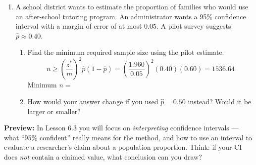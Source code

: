 \documentclass[10pt]{article}
\begin{document}
\begin{enumerate}
  \item A school district wants to estimate the proportion of families who would use
        an after-school tutoring program. An administrator wants a 95\% confidence interval
        with a margin of error of at most 0.05. A pilot survey suggests $\hat p \approx 0.40$.
        \begin{enumerate}[label=\alph*.]
          \item Find the minimum required sample size using the pilot estimate.
                \[n \ge \left(\frac{z^*}{m}\right)^2 \hat p(1-\hat p) = \left(\frac{1.960}{0.05}\right)^2(0.40)(0.60) = 1536.64\]
                Minimum $n = $ 

          \item How would your answer change if you used $\hat p = 0.50$ instead? Would it be
                larger or smaller?
        \end{enumerate}

\end{enumerate}

\begin{reflectionbox}
\textbf{Preview:} In Lesson 6.3 you will focus on \emph{interpreting} confidence intervals ---
what ``95\% confident'' really means for the method, and how to use an interval to evaluate a
researcher's claim about a population proportion. Think: if your CI does \emph{not} contain a
claimed value, what conclusion can you draw?
\end{reflectionbox}
\end{document}
